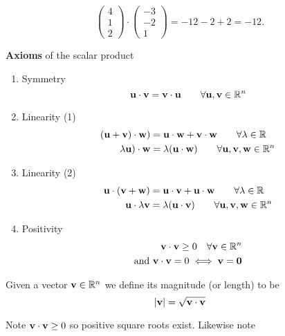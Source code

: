 \documentclass[10pt, a4paper]{article}
\begin{document}
\begin{example}
    \[
    \begin{pmatrix}
        4 \\
        1 \\
        2
    \end{pmatrix}
    \cdot
    \begin{pmatrix}
        -3 \\
        -2 \\
        1
    \end{pmatrix}
    =
    -12 - 2 + 2 = -12.
    \]
\end{example}


\textbf{Axioms} of the scalar product
\begin{enumerate}[label = (\roman*)]
    \item Symmetry
    \[
    \mathbf{u \cdot v = v \cdot u}\qquad\forall\mathbf{u, v} \in \mathbb{R} ^ n
    \]
    \item Linearity (1)
    \begin{align*}
    (\mathbf{u + v)\cdot w}) &= \mathbf{u \cdot w + v \cdot w}\qquad\forall \lambda \in \mathbb{R}\\
    \lambda\mathbf{u})\cdot \mathbf{w} &= \lambda (\mathbf{u \cdot w})\qquad\forall\mathbf{u, v, w} \in \mathbb{R} ^ n
    \end{align*}
    \item Linearity (2)
    \begin{align*}
        \mathbf{u} \cdot (\mathbf{v + w}) &= \mathbf{u} \cdot \mathbf{v} + \mathbf{u} \cdot \mathbf{w}\qquad \forall \lambda \in \mathbb{R} \\
        \mathbf{u} \cdot \lambda\mathbf{v} &= \lambda(\mathbf{u \cdot v})\qquad \forall\mathbf{u, v, w} \in \mathbb{R} ^ n
    \end{align*}
    \item Positivity
    \begin{align*}
        \mathbf{v \cdot v} \geq 0\quad \forall \mathbf{v} \in \mathbb{R} ^ n \\
        \text{and } \mathbf{v \cdot v} = 0 \iff \mathbf{v = 0}
    \end{align*}
\end{enumerate}

\begin{definition}
    Given a vector $\mathbf{v} \in \mathbb{R} ^ n$ we define its magnitude (or length) to be
    \[
    |\mathbf{v}| = \sqrt{\mathbf{v \cdot v}}
    \]
\end{definition}
Note $\mathbf{v \cdot v} \geq 0$ so positive square roots exist. Likewise note
\end{document}
